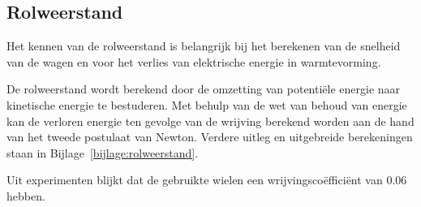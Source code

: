\subsection{Rolweerstand}

Het kennen van de rolweerstand is belangrijk bij het berekenen van de snelheid van de wagen en voor het verlies van elektrische energie in warmtevorming.

De rolweerstand wordt berekend door de omzetting van potentiële energie naar kinetische energie te bestuderen. Met behulp van de wet van behoud van energie kan de verloren energie ten gevolge van de wrijving berekend worden aan de hand van het tweede postulaat van Newton.
Verdere uitleg en uitgebreide berekeningen staan in Bijlage~\ref{bijlage:rolweerstand}.

Uit experimenten blijkt dat de gebruikte wielen een wrijvingscoëfficiënt van 0.06 hebben.